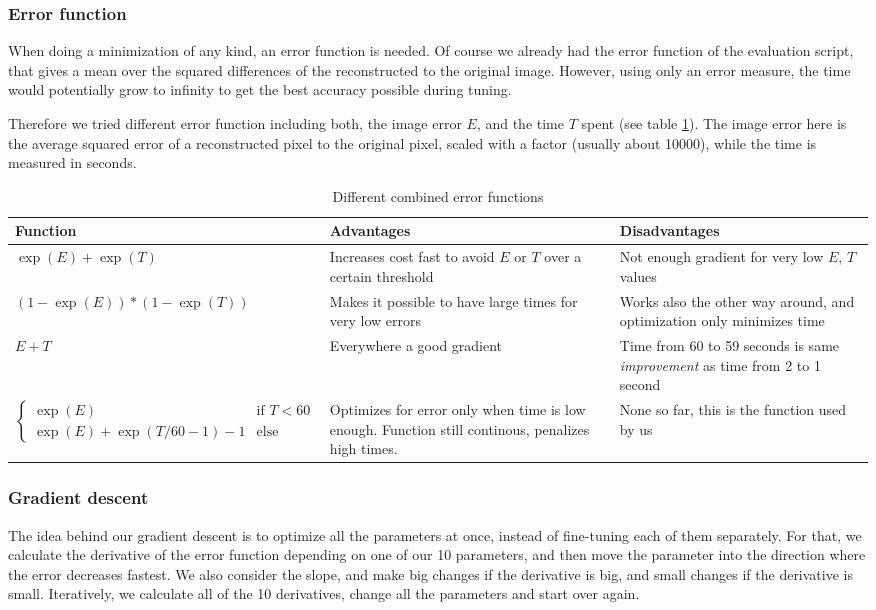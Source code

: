 \documentclass[10pt,conference,compsocconf]{IEEEtran}
\begin{document}
\subsubsection{Error function}
When doing a minimization of any kind, an error function is needed. Of course we already had the error function
of the evaluation script, that gives a mean over the squared differences of the reconstructed to the original
image. However, using only an error measure, the time would potentially grow to infinity to get the best accuracy possible during tuning.

Therefore we tried different error function including both, the image error $E$, and the time $T$ spent (see table \ref{error_function_table}). The image error here is the average
squared error of a reconstructed pixel to the original pixel, scaled with a factor (usually about 10000), while the time is measured in seconds.

\begin{table}
  \centering
  \begin{tabular}{|l|p{5cm}|p{5cm}|}
    \hline
    Function&Advantages&Disadvantages\\
    \hline
    $\exp(E)+\exp(T)$ & Increases cost fast to avoid $E$ or $T$ over a certain threshold & Not enough gradient for very low $E$, $T$ values\\
    \hline
    $(1-\exp(E))*(1-\exp(T))$ & Makes it possible to have large times for very low errors & Works also the other way around, and optimization only minimizes time\\
    \hline
    $E + T$ & Everywhere a good gradient & Time from 60 to 59 seconds is same \textit{improvement} as time from 2 to 1 second\\
    \hline
    $\begin{cases}
  \exp(E)  & \text{if }T<60\\
  \exp(E)+\exp(T/60 - 1) - 1 & \text{else}
\end{cases}$ & Optimizes for error only when time is low enough. Function still continous, penalizes high times. & None so far, this is the function used by us\\
    \hline
  \end{tabular}
  \caption{Different combined error functions}
  \label{error_function_table}
\end{table}


\subsubsection{Gradient descent}
The idea behind our gradient descent is to optimize all the parameters at once, instead of fine-tuning each of them separately. For that, we
calculate the derivative of the error function depending on one of our 10 parameters, and then move the parameter into the direction where the
error decreases fastest. We also consider the slope, and make big changes if the derivative is big, and small changes if the derivative is small.
Iteratively, we calculate all of the 10 derivatives, change all the parameters and start over again.
\end{document}
